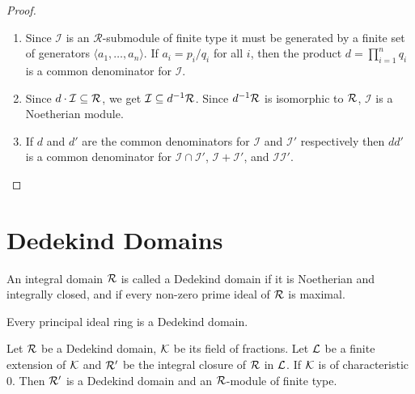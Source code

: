 \begin{proof}
  \begin{enumerate}
    \item Since $\mathcal{I}$ is an $\mathcal{R}$-submodule of finite type it must be generated by a finite set of generators $\langle a_1, \ldots, a_n\rangle$. If $a_i = p_i/q_i$  for all $i$, then the product $d = \prod_{i=1}^n q_i$ is a common denominator for $\mathcal{I}$.

    \item Since $d\cdot \mathcal{I} \subseteq \mathcal{R}$, we get $\mathcal{I} \subseteq d^{-1}\mathcal{R}$. Since $d^{-1}\mathcal{R}$ is isomorphic to $\mathcal{R}$, $\mathcal{I}$ is a Noetherian module.

    \item If $d$ and $d'$ are the common denominators for $\mathcal{I}$ and $\mathcal{I}'$ respectively then $dd'$ is a common denominator for $\mathcal{I}\cap \mathcal{I}'$, $\mathcal{I}+\mathcal{I}'$, and $\mathcal{I}\mathcal{I}'$.
  \end{enumerate}
\end{proof}

\section{Dedekind Domains}

\begin{definition}
  An integral domain $\mathcal{R}$ is called a Dedekind domain if it is Noetherian and integrally closed, and if every non-zero prime ideal of $\mathcal{R}$ is maximal.
\end{definition}

\begin{eg}
  Every principal ideal ring is a Dedekind domain.
\end{eg}

\begin{theorem}
  Let $\mathcal{R}$ be a Dedekind domain, $\mathcal{K}$ be its field of fractions. Let $\mathcal{L}$ be a finite extension of $\mathcal{K}$ and $\mathcal{R}'$ be the integral closure of $\mathcal{R}$ in $\mathcal{L}$. If $\mathcal{K}$ is of characteristic $0$. Then $\mathcal{R}'$ is a Dedekind domain and an $\mathcal{R}$-module of finite type.
\end{theorem}

